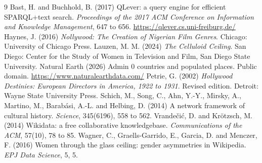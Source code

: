 \documentclass[11pt,a4paper]{article}
\begin{document}
\begin{thebibliography}{9}
 Bast, H. and Buchhold, B. (2017) QLever: a query engine for efficient SPARQL+text search. \emph{Proceedings of the 2017 ACM Conference on Information and Knowledge Management}, 647 to 656. \url{https://qlever.cs.uni-freiburg.de/}
 Haynes, J. (2016) \emph{Nollywood: The Creation of Nigerian Film Genres}. Chicago: University of Chicago Press.
 Lauzen, M. M. (2024) \emph{The Celluloid Ceiling}. San Diego: Center for the Study of Women in Television and Film, San Diego State University.
 Natural Earth (2026) Admin 0 countries and populated places. Public domain. \url{https://www.naturalearthdata.com/}
 Petrie, G. (2002) \emph{Hollywood Destinies: European Directors in America, 1922 to 1931}. Revised edition. Detroit: Wayne State University Press.
 Schich, M., Song, C., Ahn, Y.-Y., Mirsky, A., Martino, M., Barab\'asi, A.-L. and Helbing, D. (2014) A network framework of cultural history. \emph{Science}, 345(6196), 558 to 562.
 Vrandečić, D. and Krötzsch, M. (2014) Wikidata: a free collaborative knowledgebase. \emph{Communications of the ACM}, 57(10), 78 to 85.
 Wagner, C., Graells-Garrido, E., Garcia, D. and Menczer, F. (2016) Women through the glass ceiling: gender asymmetries in Wikipedia. \emph{EPJ Data Science}, 5, 5.
\end{thebibliography}
\end{document}
